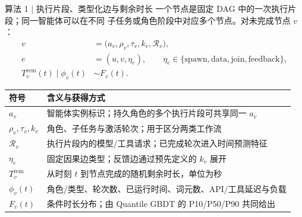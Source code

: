 \begin{frame}{算法 1 | 执行片段、类型化边与剩余时长}
  \small
  一个节点是固定 DAG 中的一次执行片段；同一智能体可以在不同
  子任务或角色阶段中对应多个节点。对未完成节点 $v$：
  \begin{equation}
    \begin{aligned}
      v&=\bigl(a_v,\rho_v,\tau_v,k_v,\mathcal R_v\bigr),\\
      e&=(u,v,\eta_e),\qquad
        \eta_e\in\{\mathrm{spawn},\mathrm{data},\mathrm{join},\mathrm{feedback}\},\\
      T_v^{\mathrm{rem}}(t)\mid\phi_v(t)&\sim F_v(t).
    \end{aligned}
    \label{eq:node-duration}
  \end{equation}

  \scriptsize
  \renewcommand{\arraystretch}{1.13}
  \begin{tabularx}{\textwidth}{p{}X}
    \toprule
    符号 & 含义与获得方式 \\
    \midrule
    $a_v$ & 智能体实例标识；持久角色的多个执行片段可共享同一 $a_v$ \\
    $\rho_v,\tau_v,k_v$ & 角色、子任务与激活轮次；用于区分两类工作流 \\
    $\mathcal R_v$ & 执行片段内的模型/工具请求；已完成轮次进入时间预测特征 \\
    $\eta_e$ & 固定因果边类型；反馈边通过预先定义的 $k_v$ 展开 \\
    $T_v^{\mathrm{rem}}$ & 从时刻 $t$ 到节点完成的随机剩余时长，单位为秒 \\
    $\phi_v(t)$ & 角色/类型、轮次数、已运行时间、词元数、API/工具延迟与负载 \\
    $F_v(t)$ & 条件时长分布；由 Quantile GBDT 的 P10/P50/P90 共同给出 \\
    \bottomrule
  \end{tabularx}

  \vspace{0.08cm}
\end{frame}

